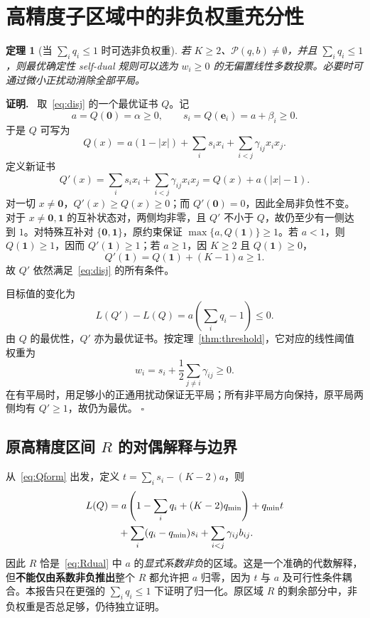 \documentclass[11pt,a4paper]{ctexart}
\newtheorem{theorem}{定理}[section]
\theoremstyle{definition}
\newenvironment{proofcn}{\par\noindent\textbf{证明.}\ }{\hfill $\square$\par}
\newcommand{\calP}{\mathcal P}
\newcommand{\one}{\mathbf 1}
\begin{document}
\section{高精度子区域中的非负权重充分性}
\begin{theorem}[当 $\sum_iq_i\le1$ 时可选非负权重]\label{thm:positive}
若 $K\ge2$、$\calP(q,b)\ne\emptyset$，并且 $\sum_iq_i\le1$，则最优确定性 self-dual 规则可以选为 $w_i\ge0$ 的无偏置线性多数投票。必要时可通过微小正扰动消除全部平局。
\end{theorem}
\begin{proofcn}
取~\eqref{eq:disj} 的一个最优证书 $Q$。记
\[
a=Q(\mathbf0)=\alpha\ge0,\qquad
s_i=Q(\mathbf e_i)=a+\beta_i\ge0.
\]
于是 $Q$ 可写为
\begin{equation}\label{eq:Qform}
Q(x)=a(1-|x|)+\sum_i s_ix_i+\sum_{i<j}\gamma_{ij}x_ix_j.
\end{equation}
定义新证书
\[
Q'(x)=\sum_i s_ix_i+\sum_{i<j}\gamma_{ij}x_ix_j
=Q(x)+a(|x|-1).
\]
对一切 $x\ne\mathbf0$，$Q'(x)\ge Q(x)\ge0$；而 $Q'(\mathbf0)=0$，因此全局非负性不变。对于 $x\ne\mathbf0,\one$ 的互补状态对，两侧均非零，且 $Q'$ 不小于 $Q$，故仍至少有一侧达到 $1$。对特殊互补对 $\{\mathbf0,\one\}$，原约束保证 $\max\{a,Q(\one)\}\ge1$。若 $a<1$，则 $Q(\one)\ge1$，因而 $Q'(\one)\ge1$；若 $a\ge1$，因 $K\ge2$ 且 $Q(\one)\ge0$，
\[
Q'(\one)=Q(\one)+(K-1)a\ge1.
\]
故 $Q'$ 依然满足~\eqref{eq:disj} 的所有条件。

目标值的变化为
\[
L(Q')-L(Q)=a\left(\sum_iq_i-1\right)\le0.
\]
由 $Q$ 的最优性，$Q'$ 亦为最优证书。按定理~\ref{thm:threshold}，它对应的线性阈值权重为
\[
w_i=s_i+\frac12\sum_{j\ne i}\gamma_{ij}\ge0.
\]
在有平局时，用足够小的正通用扰动保证无平局；所有非平局方向保持，原平局两侧均有 $Q'\ge1$，故仍为最优。
\end{proofcn}

\subsection{原高精度区间 $R$ 的对偶解释与边界}
从~\eqref{eq:Qform} 出发，定义 $t=\sum_i s_i-(K-2)a$，则
\begin{align}\label{eq:Rdual}
L(Q)&=a\left(1-\sum_iq_i+(K-2)q_{\min}\right)+q_{\min}t\\
&\quad+\sum_i(q_i-q_{\min})s_i+\sum_{i<j}\gamma_{ij}b_{ij}.\notag
\end{align}
因此 $R$ 恰是~\eqref{eq:Rdual} 中 $a$ 的\emph{显式系数非负}的区域。这是一个准确的代数解释，但\textbf{不能仅由系数非负推出}整个 $R$ 都允许把 $a$ 归零，因为 $t$ 与 $a$ 及可行性条件耦合。本报告只在更强的 $\sum_iq_i\le1$ 下证明了归一化。原区域 $R$ 的剩余部分中，非负权重是否总足够，仍待独立证明。
\end{document}
